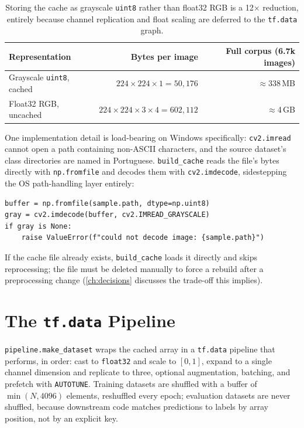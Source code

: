 \documentclass[11pt,a4paper,oneside]{report}
\newcommand{\code}[1]{\texttt{\small #1}}
\begin{document}
\begin{table}[h]
\centering
\small
\begin{tabular}{@{}lrr@{}}
\toprule
\textbf{Representation} & \textbf{Bytes per image} & \textbf{Full corpus (6.7k images)} \\
\midrule
Grayscale \code{uint8}, cached & $224 \times 224 \times 1 = 50{,}176$ & $\approx$338\,MB \\
Float32 RGB, uncached & $224 \times 224 \times 3 \times 4 = 602{,}112$ & $\approx$4\,GB \\
\bottomrule
\end{tabular}
\caption{Storing the cache as grayscale \texttt{uint8} rather than
float32 RGB is a 12$\times$ reduction, entirely because channel replication
and float scaling are deferred to the \texttt{tf.data} graph.}
\label{tab:cache-size}
\end{table}

One implementation detail is load-bearing on Windows specifically:
\code{cv2.imread} cannot open a path containing non-ASCII characters, and the
source dataset's class directories are named in Portuguese. \code{build\_cache}
reads the file's bytes directly with \code{np.fromfile} and decodes them with
\code{cv2.imdecode}, sidestepping the OS path-handling layer entirely:

\begin{lstlisting}[caption={Reading by buffer, not by path, to survive
non-ASCII directory names (\texttt{lxnet/pipeline.py}).}, label=lst:imdecode]
buffer = np.fromfile(sample.path, dtype=np.uint8)
gray = cv2.imdecode(buffer, cv2.IMREAD_GRAYSCALE)
if gray is None:
    raise ValueError(f"could not decode image: {sample.path}")
\end{lstlisting}

If the cache file already exists, \code{build\_cache} loads it directly and
skips reprocessing; the file must be deleted manually to force a rebuild
after a preprocessing change (\cref{ch:decisions} discusses the trade-off
this implies).

\section{The \texttt{tf.data} Pipeline}

\code{pipeline.make\_dataset} wraps the cached array in a \code{tf.data}
pipeline that performs, in order: cast to \code{float32} and scale to
$[0,1]$, expand to a single channel dimension and replicate to three,
optional augmentation, batching, and prefetch with \code{AUTOTUNE}. Training
datasets are shuffled with a buffer of $\min(N, 4096)$ elements, reshuffled
every epoch; evaluation datasets are never shuffled, because downstream code
matches predictions to labels by array position, not by an explicit key.
\end{document}
